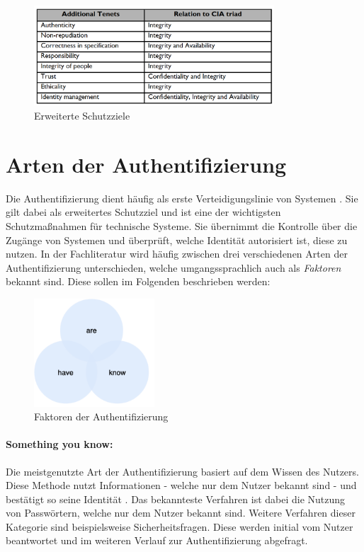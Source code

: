 \begin{figure}[h]
	\centering 
	\includegraphics[width=0.8\textwidth]{img/abbildungen/Schutzziele.png}
	\captionsetup{format=hang}
	\caption{Erweiterte Schutzziele \cite{samonas2014cia}} \label{Schutzziele}
\end{figure}



\section{Arten der Authentifizierung}

Die Authentifizierung dient häufig als erste Verteidigungslinie von Systemen \cite{boonkrong2012security}. Sie gilt dabei als erweitertes Schutzziel und ist eine der wichtigsten Schutzmaßnahmen für technische Systeme. Sie übernimmt die Kontrolle über die Zugänge von Systemen und überprüft, welche Identität autorisiert ist, diese zu nutzen. In der Fachliteratur wird häufig zwischen drei verschiedenen Arten der Authentifizierung unterschieden, welche umgangssprachlich auch als \textit{Faktoren} bekannt sind. Diese sollen im Folgenden beschrieben werden:

\begin{figure}[h]
	\centering 
	\includegraphics[width=0.4\textwidth]{img/abbildungen/factors.png}
	\captionsetup{format=hang}
	\caption{Faktoren der Authentifizierung}
\end{figure}

\paragraph*{Something you know:}
Die meistgenutzte Art der Authentifizierung basiert auf dem Wissen des Nutzers. Diese Methode nutzt Informationen - welche nur dem Nutzer bekannt sind - und bestätigt so seine Identität \cite{boonkrong2012security}. Das bekannteste Verfahren ist dabei die Nutzung von Passwörtern, welche nur dem Nutzer bekannt sind. Weitere Verfahren dieser Kategorie sind beispielsweise Sicherheitsfragen. Diese werden initial vom Nutzer beantwortet und im weiteren Verlauf zur Authentifizierung abgefragt.

